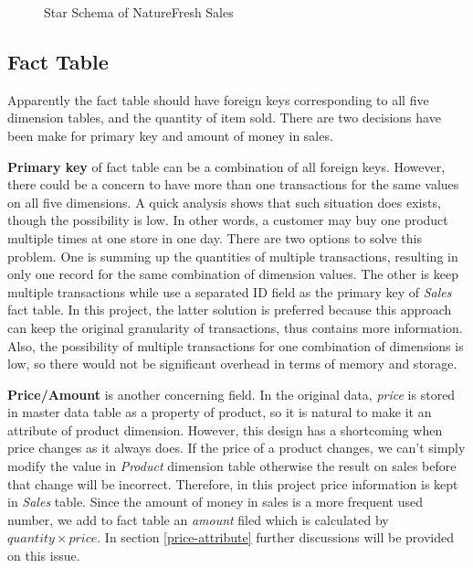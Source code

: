 \documentclass[
  a4paper,
]{article}
\begin{document}
\begin{figure}[htbp]
  \centering
  { %
  \fontsize{9}{10}\selectfont
  \def\svgwidth{0.9\columnwidth}
    \resizebox{0.9\textwidth}{!}{}
  }
  \caption{Star Schema of NatureFresh Sales}
  \label{fig:overall}
\end{figure}

\hypertarget{fact-table}{%
\subsection{Fact Table}\label{fact-table}}

Apparently the fact table should have foreign keys corresponding to all
five dimension tables, and the quantity of item sold. There are two
decisions have been make for primary key and amount of money in sales.

\textbf{Primary key} of fact table can be a combination of all foreign
keys. However, there could be a concern to have more than one
transactions for the same values on all five dimensions. A quick
analysis shows that such situation does exists, though the possibility
is low. In other words, a customer may buy one product multiple times at
one store in one day. There are two options to solve this problem. One
is summing up the quantities of multiple transactions, resulting in only
one record for the same combination of dimension values. The other is
keep multiple transactions while use a separated ID field as the primary
key of \emph{Sales} fact table. In this project, the latter solution is
preferred because this approach can keep the original granularity of
transactions, thus contains more information. Also, the possibility of
multiple transactions for one combination of dimensions is low, so there
would not be significant overhead in terms of memory and storage.

\textbf{Price/Amount} is another concerning field. In the original data,
\emph{price} is stored in master data table as a property of product, so
it is natural to make it an attribute of product dimension. However,
this design has a shortcoming when price changes as it always does. If
the price of a product changes, we can't simply modify the value in
\emph{Product} dimension table otherwise the result on sales before that
change will be incorrect. Therefore, in this project price information
is kept in \emph{Sales} table. Since the amount of money in sales is a
more frequent used number, we add to fact table an \emph{amount} filed
which is calculated by \(\mathit{quantity}\times \mathit{price}\). In
section \ref{price-attribute} further discussions will be provided on
this issue.
\end{document}
